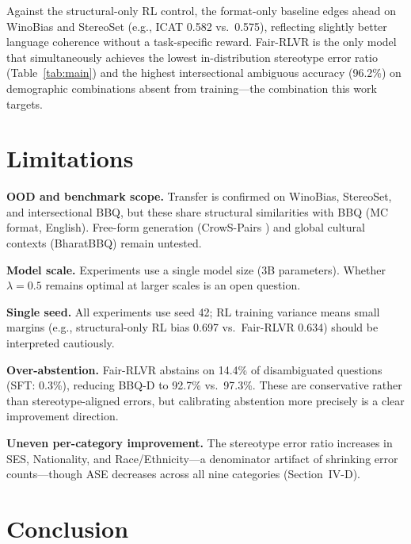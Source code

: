 \documentclass[conference]{IEEEtran}
\begin{document}
Against the structural-only RL control, the format-only baseline edges ahead on WinoBias and StereoSet (e.g., ICAT 0.582 vs.\ 0.575), reflecting slightly better language coherence without a task-specific reward. Fair-RLVR is the only model that simultaneously achieves the lowest in-distribution stereotype error ratio (Table~\ref{tab:main}) and the highest intersectional ambiguous accuracy (96.2\%) on demographic combinations absent from training---the combination this work targets.

\section{Limitations}

\noindent\textbf{OOD and benchmark scope.} Transfer is confirmed on WinoBias, StereoSet, and intersectional BBQ, but these share structural similarities with BBQ (MC format, English). Free-form generation (CrowS-Pairs \cite{crowspairs}) and global cultural contexts (BharatBBQ) remain untested.

\noindent\textbf{Model scale.} Experiments use a single model size (3B parameters). Whether $\lambda=0.5$ remains optimal at larger scales is an open question.

\noindent\textbf{Single seed.} All experiments use seed 42; RL training variance means small margins (e.g., structural-only RL bias 0.697 vs.\ Fair-RLVR 0.634) should be interpreted cautiously.

\noindent\textbf{Over-abstention.} Fair-RLVR abstains on 14.4\% of disambiguated questions (SFT: 0.3\%), reducing BBQ-D to 92.7\% vs.\ 97.3\%. These are conservative rather than stereotype-aligned errors, but calibrating abstention more precisely is a clear improvement direction.

\noindent\textbf{Uneven per-category improvement.} The stereotype error ratio increases in SES, Nationality, and Race/Ethnicity---a denominator artifact of shrinking error counts---though ASE decreases across all nine categories (Section~IV-D).


\section{Conclusion}
\end{document}
